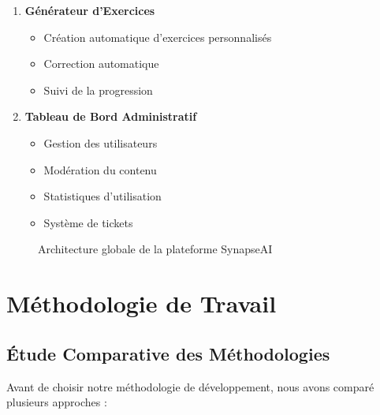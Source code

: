 \begin{enumerate}
    \item \textbf{Générateur d'Exercices}
    \begin{itemize}
        \item Création automatique d'exercices personnalisés
        \item Correction automatique
        \item Suivi de la progression
    \end{itemize}
    
    \item \textbf{Tableau de Bord Administratif}
    \begin{itemize}
        \item Gestion des utilisateurs
        \item Modération du contenu
        \item Statistiques d'utilisation
        \item Système de tickets
    \end{itemize}
\end{enumerate}

\begin{figure}[H]
    \centering
    \caption{Architecture globale de la plateforme SynapseAI}
    \label{fig:architecture-globale}
\end{figure}

\section{Méthodologie de Travail}

\subsection{Étude Comparative des Méthodologies}

Avant de choisir notre méthodologie de développement, nous avons comparé plusieurs approches :

